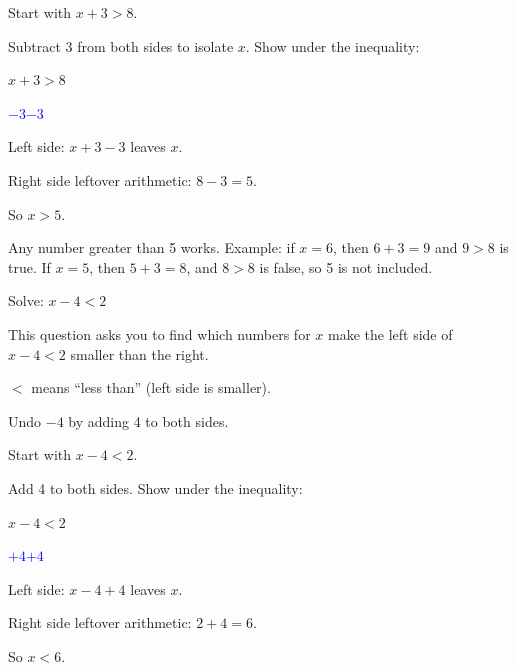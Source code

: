 \begin{steps}
  \item Start with $x + 3 > 8$.
  \item Subtract 3 from both sides to isolate $x$. Show under the inequality:
        \begin{center}
          $x + 3 > 8$\par\smallskip
          \underline{\hspace{0.6em}\textcolor{blue}{$-3$}\hspace{1.6em}\textcolor{blue}{$-3$}\hspace{0.6em}}
        \end{center}
  \item Left side: $x + 3 - 3$ leaves $x$.
  \item Right side leftover arithmetic: $8 - 3 = 5$.
  \item So $x > 5$.
\end{steps}


Any number greater than 5 works. Example: if $x = 6$, then $6 + 3 = 9$ and
$9 > 8$ is true. If $x = 5$, then $5 + 3 = 8$, and $8 > 8$ is false, so 5 is not
included.


Solve: $x - 4 < 2$\ \blank[2.4cm]


This question asks you to find which numbers for $x$ make the left side of
$x - 4 < 2$ smaller than the right.

\begin{words}
  \item $<$ means ``less than'' (left side is smaller).
  \item Undo $-4$ by adding 4 to both sides.
\end{words}

\begin{steps}
  \item Start with $x - 4 < 2$.
  \item Add 4 to both sides. Show under the inequality:
        \begin{center}
          $x - 4 < 2$\par\smallskip
          \underline{\hspace{0.6em}\textcolor{blue}{$+4$}\hspace{1.6em}\textcolor{blue}{$+4$}\hspace{0.6em}}
        \end{center}
  \item Left side: $x - 4 + 4$ leaves $x$.
  \item Right side leftover arithmetic: $2 + 4 = 6$.
  \item So $x < 6$.
\end{steps}

